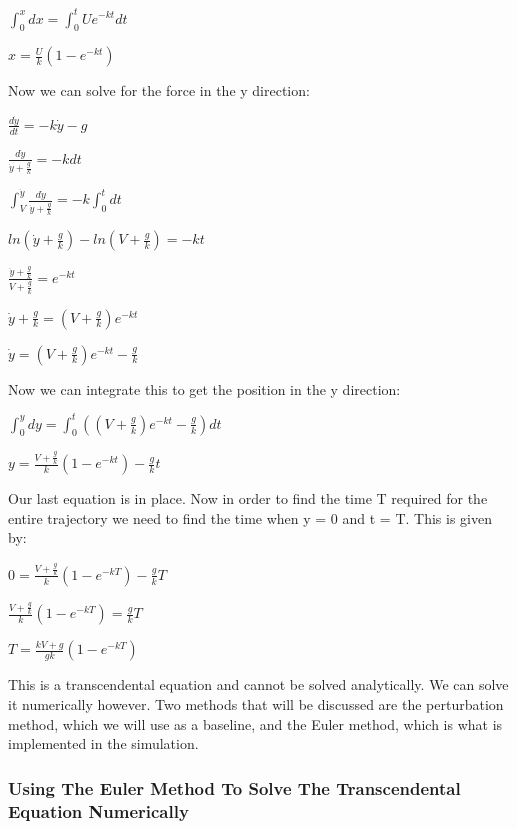 \documentclass[11pt]{article}
\begin{document}
\(\int_{0}^{x} dx = \int_{0}^{t} Ue^{-kt}dt\)

\(x = \frac{U}{k}(1 - e^{-kt})\)

Now we can solve for the force in the y direction:

\(\frac{d\dot{y}}{dt} = -k\dot{y} - g\)

\(\frac{d\dot{y}}{\dot{y} + \frac{g}{k}} = -kdt\)

\(\int_{V}^{\dot{y}} \frac{d\dot{y}}{\dot{y} + \frac{g}{k}} = -k\int_{0}^{t}dt\)

\(ln(\dot{y} + \frac{g}{k}) - ln(V + \frac{g}{k}) = -kt\)

\(\frac{\dot{y} + \frac{g}{k}}{V + \frac{g}{k}} = e^{-kt}\)

\(\dot{y} + \frac{g}{k} = (V + \frac{g}{k})e^{-kt}\)

\(\dot{y} = (V + \frac{g}{k})e^{-kt} - \frac{g}{k}\)

Now we can integrate this to get the position in the y direction:

\(\int_{0}^{y} dy = \int_{0}^{t} ((V + \frac{g}{k})e^{-kt} - \frac{g}{k})dt\)

\(y = \frac{V + \frac{g}{k}}{k}(1 - e^{-kt}) - \frac{g}{k}t\)

Our last equation is in place. Now in order to find the time T required
for the entire trajectory we need to find the time when y = 0 and t = T.
This is given by:

\(0 = \frac{V + \frac{g}{k}}{k}(1 - e^{-kT}) - \frac{g}{k}T\)

\(\frac{V + \frac{g}{k}}{k}(1 - e^{-kT}) = \frac{g}{k}T\)

\(T = \frac{kV + g}{gk}(1 - e^{-kT})\)

This is a transcendental equation and cannot be solved analytically. We
can solve it numerically however. Two methods that will be discussed are
the perturbation method, which we will use as a baseline, and the Euler
method, which is what is implemented in the simulation.

    \hypertarget{using-the-euler-method-to-solve-the-transcendental-equation-numerically}{%
\subsubsection{\texorpdfstring{\textbf{Using The Euler Method To Solve
The Transcendental Equation
Numerically}}{Using The Euler Method To Solve The Transcendental Equation Numerically}}\label{using-the-euler-method-to-solve-the-transcendental-equation-numerically}}
\end{document}
